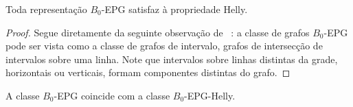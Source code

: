 

\begin {lema} \label{lem:b0epg}
Toda representação $ B_0$-EPG satisfaz à propriedade Helly.
\end {lema}

\begin{proof}
Segue diretamente da seguinte observação de \citeauthor{golumbic2009}~\cite{golumbic2009}: a classe de grafos $B_0$-EPG pode ser vista como a classe de grafos de intervalo, grafos de intersecção de intervalos sobre uma linha. Note que  intervalos sobre linhas distintas da grade, horizontais ou verticais, formam componentes distintas do grafo.
\end{proof}



\begin{corollary}
A classe $B_0$-EPG coincide com a classe $B_0$-EPG-Helly.
\end{corollary}

